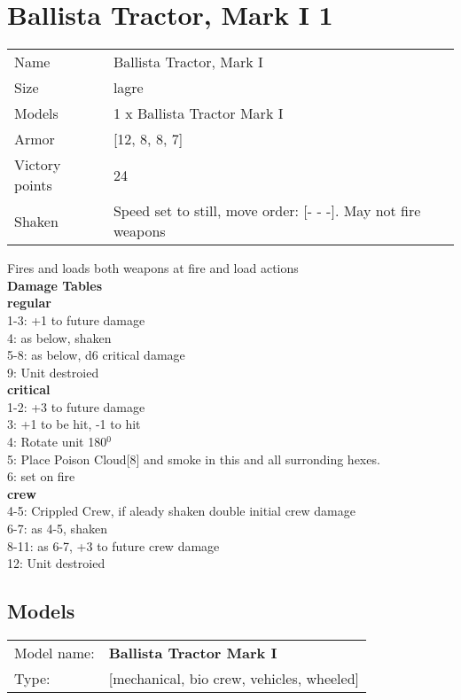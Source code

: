 \clearpage

\section{ Ballista Tractor, Mark I 1 }

\begin{tabular}{ll}
  Name & Ballista Tractor, Mark I \\
  Size & lagre\\
  Models & 1 x Ballista Tractor Mark I\\
  Armor & [12, 8, 8, 7]\\
  Victory points & 24\\
  Shaken & Speed set to still, move order: [- - -]. May not fire weapons\\
\end{tabular}

Fires and loads both weapons at fire and load actions\\ 



{\bf Damage Tables} \\
 {\bf regular } \\
1-3: +1 to future damage \\
4: as below, shaken \\
5-8: as below, d6 critical damage \\
9: Unit destroied \\
 {\bf critical } \\
1-2: +3 to future damage \\
3: +1 to be hit, -1 to hit \\
4: Rotate unit 180$^0$ \\
5: Place Poison Cloud[8] and smoke in this and all surronding hexes. \\
6: set on fire \\
 {\bf crew } \\
4-5: Crippled Crew, if aleady shaken double initial crew damage \\
6-7: as 4-5, shaken \\
8-11: as 6-7, +3 to future crew damage \\
12: Unit destroied \\


\clearpage

\subsection{ Models }

\begin{tabular}{ll}
Model name: & {\bf Ballista Tractor Mark I } \\
Type: & [mechanical, bio crew, vehicles, wheeled] \\
\end{tabular}

